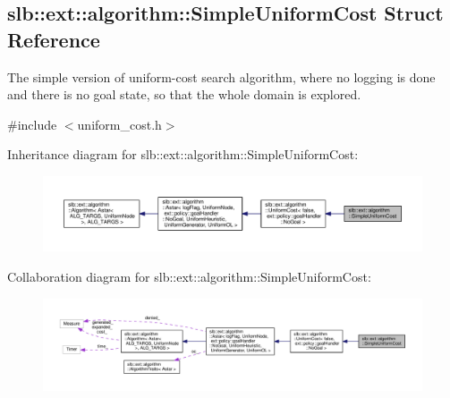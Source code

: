 \hypertarget{structslb_1_1ext_1_1algorithm_1_1SimpleUniformCost}{}\subsection{slb\+:\+:ext\+:\+:algorithm\+:\+:Simple\+Uniform\+Cost Struct Reference}
\label{structslb_1_1ext_1_1algorithm_1_1SimpleUniformCost}


The simple version of uniform-\/cost search algorithm, where no logging is done and there is no goal state, so that the whole domain is explored.  




{\ttfamily \#include $<$uniform\+\_\+cost.\+h$>$}



Inheritance diagram for slb\+:\+:ext\+:\+:algorithm\+:\+:Simple\+Uniform\+Cost\+:\nopagebreak
\begin{figure}[H]
\begin{center}
\leavevmode
\includegraphics[width=350pt]{structslb_1_1ext_1_1algorithm_1_1SimpleUniformCost__inherit__graph}
\end{center}
\end{figure}


Collaboration diagram for slb\+:\+:ext\+:\+:algorithm\+:\+:Simple\+Uniform\+Cost\+:\nopagebreak
\begin{figure}[H]
\begin{center}
\leavevmode
\includegraphics[width=350pt]{structslb_1_1ext_1_1algorithm_1_1SimpleUniformCost__coll__graph}
\end{center}
\end{figure}
